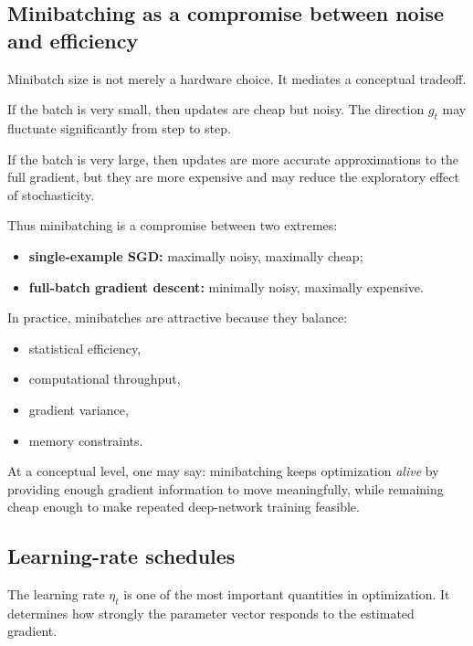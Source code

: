 \subsection*{Minibatching as a compromise between noise and efficiency}

Minibatch size is not merely a hardware choice.
It mediates a conceptual tradeoff.

\medskip

If the batch is very small, then updates are cheap but noisy.
The direction $g_t$ may fluctuate significantly from step to step.

\medskip

If the batch is very large, then updates are more accurate approximations to the full gradient, but they are more expensive and may reduce the exploratory effect of stochasticity.

\medskip

Thus minibatching is a compromise between two extremes:
\begin{itemize}
    \item \textbf{single-example SGD:} maximally noisy, maximally cheap;
    \item \textbf{full-batch gradient descent:} minimally noisy, maximally expensive.
\end{itemize}

\medskip

In practice, minibatches are attractive because they balance:
\begin{itemize}
    \item statistical efficiency,
    \item computational throughput,
    \item gradient variance,
    \item memory constraints.
\end{itemize}

\medskip

At a conceptual level, one may say:
minibatching keeps optimization \emph{alive} by providing enough gradient information to move meaningfully, while remaining cheap enough to make repeated deep-network training feasible.

\subsection*{Learning-rate schedules}

The learning rate $\eta_t$ is one of the most important quantities in optimization.
It determines how strongly the parameter vector responds to the estimated gradient.

